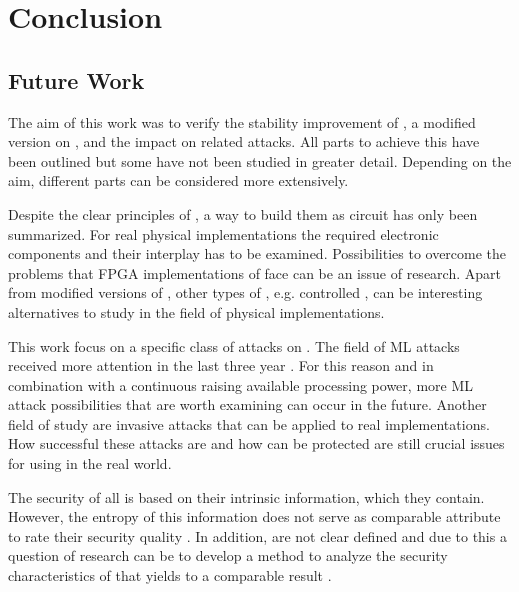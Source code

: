 \chapter{Conclusion}
\label{cap:conclusion}

\section{Future Work}

The aim of this work was to verify the stability improvement of \mpufs, a modified version on \apufs, and the impact on related attacks.
All parts to achieve this have been outlined but some have not been studied in greater detail.
Depending on the aim, different parts can be considered more extensively.

Despite the clear principles of \apufs, a way to build them as circuit has only been summarized.
For real physical implementations the required electronic components and their interplay has to be examined.
Possibilities to overcome the problems that \ac{FPGA} implementations of \apufs face can be an issue of research.
Apart from modified versions of \apufs, other types of \pufs, e.g. controlled \pufs, can be interesting alternatives to study in the field of physical implementations.

This work focus on a specific class of attacks on \pufs.
The field of \ac{ML} attacks received more attention in the last three year \cite{2017MachineTrends}.
For this reason and in combination with a continuous raising available processing power, more \ac{ML} attack possibilities that are worth examining can occur in the future.
Another field of study are invasive attacks that can be applied to real \puf implementations.
How successful these attacks are and how \pufs can be protected are still crucial issues for using \pufs in the real world.

The security of all \pufs is based on their intrinsic information, which they contain.
However, the entropy of this information does not serve as comparable attribute to rate their security quality \cite{Ruhrmair2010ModelingFunctions}.
In addition, \pufs are not clear defined and due to this a question of research can be to develop a method to analyze the security characteristics of \pufs that yields to a comparable result \cite{Becker2015ThePUFs}.

